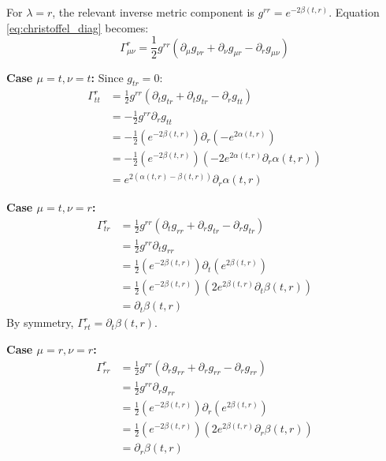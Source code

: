 \documentclass[11pt, a4paper]{report}
\begin{document}
For $\lambda = r$, the relevant inverse metric component is $g^{rr} = e^{-2\beta(t,r)}$. 
Equation \eqref{eq:christoffel_diag} becomes:
\begin{equation}
    \Gamma^r_{\mu\nu} = \frac{1}{2} g^{rr} (\partial_\mu g_{\nu r} + \partial_\nu g_{\mu r} - \partial_r g_{\mu\nu})
\end{equation}

\textbf{Case $\mu = t, \nu = t$:}
Since $g_{tr} = 0$:
\begin{align}
    \Gamma^r_{tt} &= \frac{1}{2} g^{rr} (\partial_t g_{tr} + \partial_t g_{tr} - \partial_r g_{tt}) \nonumber \\
    &= -\frac{1}{2} g^{rr} \partial_r g_{tt} \nonumber \\
    &= -\frac{1}{2} \left( e^{-2\beta(t,r)} \right) \partial_r \left( -e^{2\alpha(t,r)} \right) \nonumber \\
    &= -\frac{1}{2} \left( e^{-2\beta(t,r)} \right) \left( -2 e^{2\alpha(t,r)} \partial_r \alpha(t,r) \right) \nonumber \\
    &= e^{2(\alpha(t,r) - \beta(t,r))} \partial_r \alpha(t,r)
\end{align}

\textbf{Case $\mu = t, \nu = r$:}
\begin{align}
    \Gamma^r_{tr} &= \frac{1}{2} g^{rr} (\partial_t g_{rr} + \partial_r g_{tr} - \partial_r g_{tr}) \nonumber \\
    &= \frac{1}{2} g^{rr} \partial_t g_{rr} \nonumber \\
    &= \frac{1}{2} \left( e^{-2\beta(t,r)} \right) \partial_t \left( e^{2\beta(t,r)} \right) \nonumber \\
    &= \frac{1}{2} \left( e^{-2\beta(t,r)} \right) \left( 2 e^{2\beta(t,r)} \partial_t \beta(t,r) \right) \nonumber \\
    &= \partial_t \beta(t,r)
\end{align}
By symmetry, $\Gamma^r_{rt} = \partial_t \beta(t,r)$.

\textbf{Case $\mu = r, \nu = r$:}
\begin{align}
    \Gamma^r_{rr} &= \frac{1}{2} g^{rr} (\partial_r g_{rr} + \partial_r g_{rr} - \partial_r g_{rr}) \nonumber \\
    &= \frac{1}{2} g^{rr} \partial_r g_{rr} \nonumber \\
    &= \frac{1}{2} \left( e^{-2\beta(t,r)} \right) \partial_r \left( e^{2\beta(t,r)} \right) \nonumber \\
    &= \frac{1}{2} \left( e^{-2\beta(t,r)} \right) \left( 2 e^{2\beta(t,r)} \partial_r \beta(t,r) \right) \nonumber \\
    &= \partial_r \beta(t,r)
\end{align}
\end{document}
